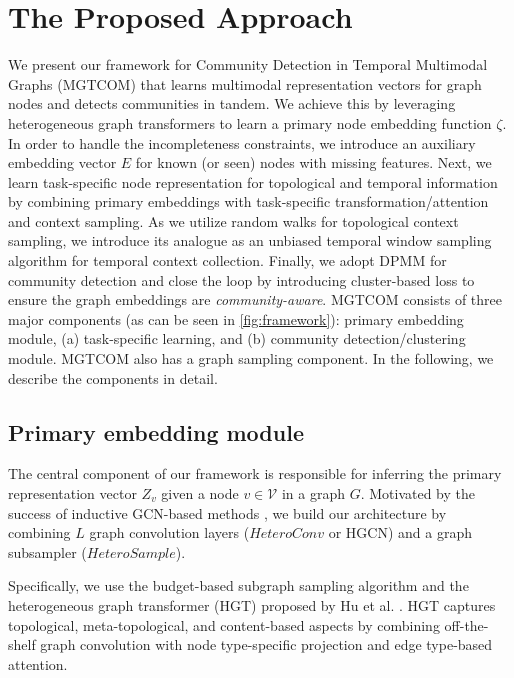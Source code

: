 \chapter{The Proposed Approach}\label{sec:approach}



We present our framework for Community Detection in Temporal Multimodal Graphs (MGTCOM) that learns multimodal representation vectors for graph nodes and detects communities in tandem.
We achieve this by leveraging heterogeneous graph transformers \cite{huHeterogeneousGraphTransformer2020} to learn a primary node embedding function $\zeta$. In order to handle the incompleteness constraints, we introduce an auxiliary embedding vector $E$ for known (or seen) nodes with missing features.
Next, we learn task-specific node representation for topological and temporal information by combining primary embeddings with task-specific transformation/attention and context sampling. 
As we utilize random walks for topological context sampling, we introduce its analogue as an unbiased temporal window sampling algorithm for temporal context collection.
Finally, we adopt DPMM for community detection and close the loop by introducing cluster-based loss to ensure the graph embeddings are \textit{community-aware}.
%
MGTCOM consists of three major components (as can be seen in \cref{fig:framework}): primary embedding module, (a) task-specific learning, and (b) community detection/clustering module. MGTCOM also has a graph sampling component.  In the following, we describe the components in detail. 

\section{Primary embedding module}
The central component of our framework is responsible for inferring the primary representation vector $Z_v$ given a node $v \in \mathcal{V}$ in a graph $G$. 
%
Motivated by the success of inductive GCN-based methods \cite{hamiltonInductiveRepresentationLearning2017, yingGraphConvolutionalNeural2018, huHeterogeneousGraphTransformer2020}, we build our architecture by combining $L$ graph convolution layers ($\mathit{HeteroConv}$ or HGCN) and a graph subsampler ($\mathit{HeteroSample}$). 

Specifically, we use the budget-based subgraph sampling algorithm and the heterogeneous graph transformer (HGT) proposed by Hu et al. \cite{huangInformationFusionOriented2022}.
HGT captures topological, meta-topological, and content-based aspects by combining off-the-shelf graph convolution with node type-specific projection and edge type-based attention.

